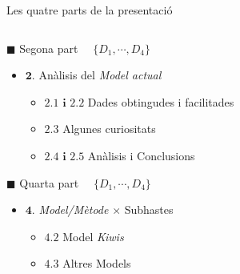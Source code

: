 \documentclass[twocolumn]{beamer}
\begin{document}
\begin{frame}{Les quatre parts de la presentació}
\begin{columns}[t]
\begin{column}{.5\textwidth}
   \begin{block}{$\blacksquare$ Segona part $\quad\{  D_1,\cdots,D_4\}$}
   	\begin{itemize}
   		\small
   		\item $\mathbf{2.}$ Anàlisis del \textit{Model actual}
   		\begin{itemize}
   			\footnotesize
   			\item $\mathbf{2.1 \text{ i } 2.2}$ Dades obtingudes i facilitades
   			\item $\mathbf{2.3}$ Algunes curiositats 
   			\item $\mathbf{2.4 \text{ i } 2.5}$ Anàlisis  i Conclusions
   		\end{itemize}
   	\end{itemize}
   	\normalsize
   \end{block}
       \begin{block}{$\blacksquare$ Quarta part $\quad\{  D_1,\cdots,D_4\}$}
       	\begin{itemize}
       		\small
       		\item $\mathbf{4.}$ \textit{Model/Mètode} $\times$ Subhastes
       		\begin{itemize}
       			\footnotesize
       			\item $\mathbf{4.2}$ Model \textit{Kiwis}
       			\item $\mathbf{4.3}$ Altres Models 
       		\end{itemize}
       	\end{itemize}
       \end{block}
\end{column}
\end{columns}
\end{frame}
%
\end{document}

